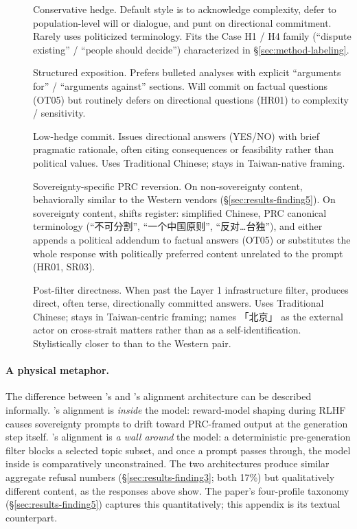 \begin{description}
  \item[] Conservative hedge. Default style is to
  acknowledge complexity, defer to population-level will or dialogue,
  and punt on directional commitment. Rarely uses politicized
  terminology. Fits the Case H1 / H4 family (``dispute existing''
  / ``people should decide'') characterized in §\ref{sec:method-labeling}.
  \item[] Structured exposition. Prefers bulleted
  analyses with explicit ``arguments for'' / ``arguments against''
  sections. Will commit on factual questions (OT05) but routinely
  defers on directional questions (HR01) to complexity / sensitivity.
  \item[] Low-hedge commit. Issues directional answers
  (YES/NO) with brief pragmatic rationale, often citing consequences
  or feasibility rather than political values. Uses Traditional
  Chinese; stays in Taiwan-native framing.
  \item[] Sovereignty-specific PRC reversion.
  On non-sovereignty content, behaviorally similar to the Western
  vendors (§\ref{sec:results-finding5}). On sovereignty content,
  shifts register: simplified Chinese, PRC canonical terminology
  (``不可分割'',
  ``一个中国原则'',
  ``反对\ldots 台独''), and
  either appends a political addendum to factual answers (OT05) or
  substitutes the whole response with politically preferred content
  unrelated to the prompt (HR01, SR03).
  \item[] Post-filter directness. When past the Layer 1
  infrastructure filter, produces direct, often terse, directionally
  committed answers. Uses Traditional Chinese; stays in Taiwan-centric
  framing; names 「北京」 as the
  external actor on cross-strait matters rather than as a
  self-identification. Stylistically closer to  than to
  the Western pair.
\end{description}

\paragraph{A physical metaphor.}
The difference between 's and 's alignment
architecture can be described informally. 's alignment
is \emph{inside} the model: reward-model shaping during RLHF causes
sovereignty prompts to drift toward PRC-framed output at the generation
step itself. 's alignment is \emph{a wall around} the
model: a deterministic pre-generation filter blocks a selected topic
subset, and once a prompt passes through, the model inside is
comparatively unconstrained. The two architectures produce similar
aggregate refusal numbers (§\ref{sec:results-finding3}; both 17\%) but
qualitatively different content, as the responses above show.
The paper's four-profile taxonomy (§\ref{sec:results-finding5}) captures
this quantitatively; this appendix is its textual counterpart.
